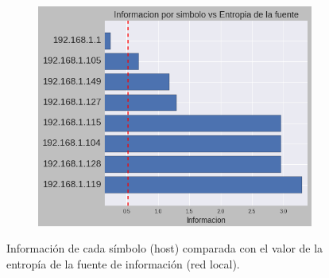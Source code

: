 \begin{figure}[h]
  \begin{subfigure}{.5\textwidth}
    \includegraphics[width=\textwidth]{imagenes/hogarenia/hosts_informaciones_vs_entropia.png}
  \end{subfigure}
  \label{fig:exp2_hogar_hosts_infovsentro}
  \caption{Información de cada símbolo (host) comparada con el valor de la entropía de la fuente de información (red local).}
\end{figure}

\\
\newpage
